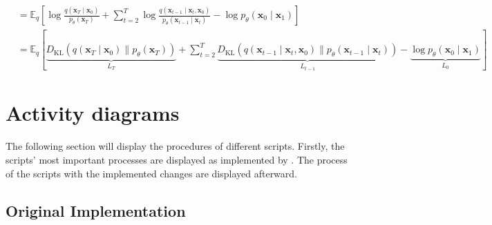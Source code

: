 \begin{subequations}
\begin{align}
	& =\mathbb{E}_q\left[\log \frac{q\left(\mathbf{x}_T \mid \mathbf{x}_0\right)}{p_\theta\left(\mathbf{x}_T\right)}+\sum_{t=2}^T \log \frac{q\left(\mathbf{x}_{t-1} \mid \mathbf{x}_t, \mathbf{x}_0\right)}{p_\theta\left(\mathbf{x}_{t-1} \mid \mathbf{x}_t\right)}-\log p_\theta\left(\mathbf{x}_0 \mid \mathbf{x}_1\right)\right] \\
	& =\mathbb{E}_q[\underbrace{D_{\mathrm{KL}}\left(q\left(\mathbf{x}_T \mid \mathbf{x}_0\right) \| p_\theta\left(\mathbf{x}_T\right)\right)}_{L_T}+\sum_{t=2}^T \underbrace{D_{\mathrm{KL}}\left(q\left(\mathbf{x}_{t-1} \mid \mathbf{x}_t, \mathbf{x}_0\right) \| p_\theta\left(\mathbf{x}_{t-1} \mid \mathbf{x}_t\right)\right)}_{L_{t-1}}-\underbrace{\log p_\theta\left(\mathbf{x}_0 \mid \mathbf{x}_1\right)}_{L_0}]
	\end{align}
\end{subequations}
\endgroup

\newpage


\section{Activity diagrams}
\label{A:activity_diagrams}

The following section will display the procedures of different scripts.
Firstly, the scripts' most important processes are displayed as implemented by \cite{kotelnikov2022TabDDPMModellingTabular}. 
The process of the scripts with the implemented changes are displayed afterward.

\subsection[]{Original Implementation}
\label{A:Original_implementation}

